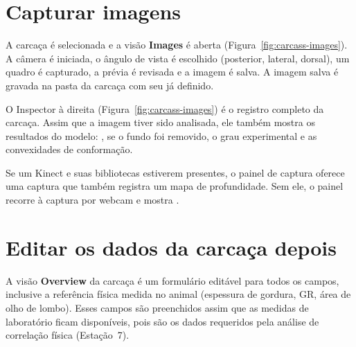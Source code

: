 \section{Capturar imagens}

A carcaça é selecionada e a visão \textbf{Images} é aberta
(Figura~\ref{fig:carcass-images}). A câmera é iniciada, o ângulo de vista é escolhido
(posterior, lateral, dorsal), um quadro é capturado, a prévia é revisada e a imagem
é salva. A imagem salva é gravada na pasta da carcaça com seu  já
definido.


O Inspector à direita (Figura~\ref{fig:carcass-images}) é o registro completo
da carcaça. Assim que a imagem tiver sido analisada, ele também mostra os resultados
do modelo: , se o fundo foi removido, o grau
experimental e as convexidades de conformação.

\begin{note}[title={Kinect (RGB + profundidade), opcional}]
Se um Kinect e suas bibliotecas estiverem presentes, o painel de captura oferece uma
captura  que também registra um mapa de profundidade. Sem ele, o painel
recorre à captura por webcam e mostra .
\end{note}

\section{Editar os dados da carcaça depois}

A visão \textbf{Overview} da carcaça é um formulário editável para todos os campos,
inclusive a referência física medida no animal (espessura de gordura, GR, área de olho
de lombo). Esses campos são preenchidos assim que as medidas de laboratório ficam
disponíveis, pois são os dados requeridos pela análise de correlação física
(Estação~7).
